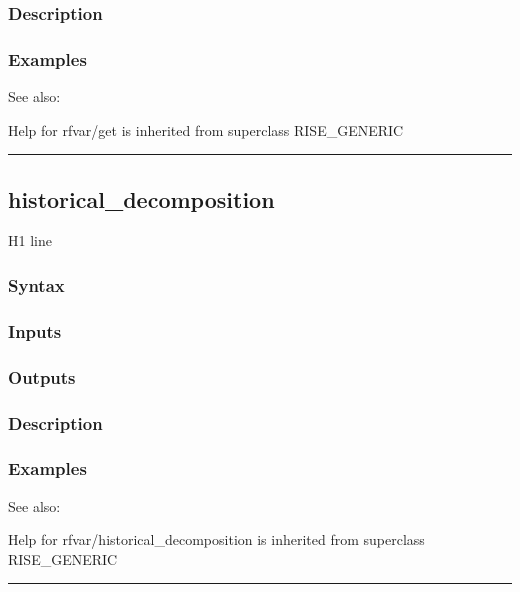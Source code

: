 \documentclass[letterpaper,10pt,english]{sphinxmanual}
\begin{document}
\subsubsection{Description}
\label{classes/models/@rfvar/rfvar:id30}

\subsubsection{Examples}
\label{classes/models/@rfvar/rfvar:id31}
See also:

Help for rfvar/get is inherited from superclass RISE\_GENERIC


\bigskip\hrule{}\bigskip



\subsection{historical\_decomposition}
\label{classes/models/@rfvar/rfvar:id32}\label{classes/models/@rfvar/rfvar:historical-decomposition}
H1 line


\subsubsection{Syntax}
\label{classes/models/@rfvar/rfvar:id33}

\subsubsection{Inputs}
\label{classes/models/@rfvar/rfvar:id34}

\subsubsection{Outputs}
\label{classes/models/@rfvar/rfvar:id35}

\subsubsection{Description}
\label{classes/models/@rfvar/rfvar:id36}

\subsubsection{Examples}
\label{classes/models/@rfvar/rfvar:id37}
See also:

Help for rfvar/historical\_decomposition is inherited from superclass RISE\_GENERIC


\bigskip\hrule{}\bigskip
\end{document}
